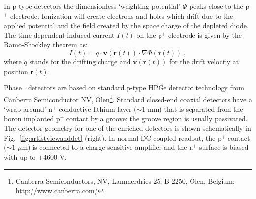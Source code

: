 In p-type detectors the dimensionless `weighting potential' $\Phi$ peaks close to the p$^+$ electrode. Ionization will create electrons and holes which drift due to the applied potential and the field created by the space charge of the depleted diode. The time dependent induced current $I(t)$ on the p$^+$ electrode is given by the Ramo-Shockley theorem \cite{schockley-ramo} as:
\begin{equation}I(t)=q\cdot\mathbf{v}(\mathbf{r}(t))\cdot\nabla\Phi(\mathbf{r}(t))\;,\end{equation}
where $q$ stands for the drifting charge and $\mathbf{v}(\mathbf{r}(t))$ for the drift velocity at position $\mathbf{r}(t)$.

Phase \textsc{i} detectors are based on standard p-type HPGe detector technology from Canberra Semiconductor NV, Olen\footnote{Canberra Semiconductors, NV, Lammerdries 25, B-2250, Olen, Belgium; \url{http://www.canberra.com/}}. Standard closed-end coaxial detectors have a `wrap around' $\text{n}^+$ conductive lithium layer ($\sim1$ mm) that is separated from the boron implanted $\text{p}^+$ contact by a groove; the groove region is usually passivated. The detector geometry for one of the enriched detectors is shown schematically in Fig.~\ref{fig:artistviewanddet} (right). In normal DC coupled readout, the p$^+$ contact ($\sim1$ $\mu$m) is connected to a charge sensitive amplifier and the n$^+$ surface is biased with up to +4600 V.

